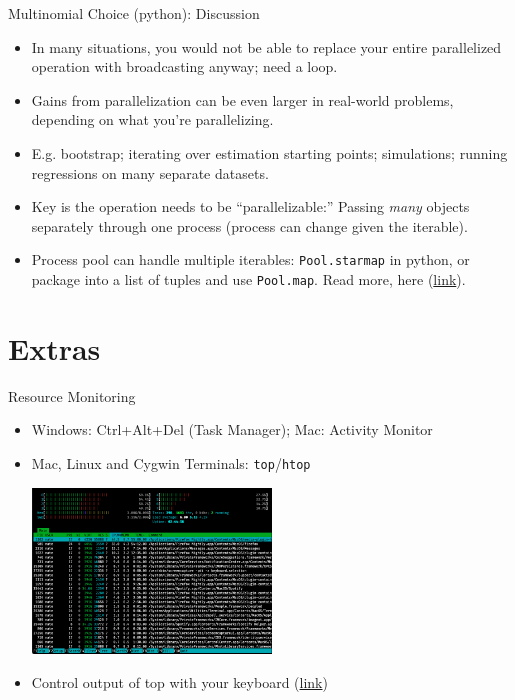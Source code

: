 \documentclass[aspectratio=1610,handout]{beamer}
\begin{document}
\begin{frame}{Multinomial Choice (python): Discussion}
\begin{itemize}
        \newpage
        \item In many situations, you would not be able to replace your entire parallelized operation with broadcasting anyway; need a loop.
        \item Gains from parallelization can be even larger in real-world problems, depending on what you're parallelizing.
        \item E.g. bootstrap; iterating over estimation starting points; simulations; running regressions on many separate datasets.
        \item Key is the operation needs to be ``parallelizable:'' Passing \emph{many} objects separately through one process (process can change given the iterable).
        \item Process pool can handle multiple iterables: \verb|Pool.starmap| in python, or package into a list of tuples and use \verb|Pool.map|. Read more, here (\href{https://docs.python.org/3/library/multiprocessing.html#multiprocessing.pool.Pool}{link}).
    \end{itemize}
\end{frame}

\section{Extras}

\begin{frame}{Resource Monitoring}
    \begin{itemize}
        \item Windows: Ctrl+Alt+Del (Task Manager); Mac: Activity Monitor
        \item Mac, Linux and Cygwin Terminals: \texttt{top}/\texttt{htop}
        \begin{center}
            \includegraphics[width=0.5\textwidth]{htop.png}
        \end{center}
        \item Control output of top with your keyboard (\href{https://opensource.com/article/18/8/top-tips-speed-up-computer}{link})
    \end{itemize}
\end{frame}
\end{document}
